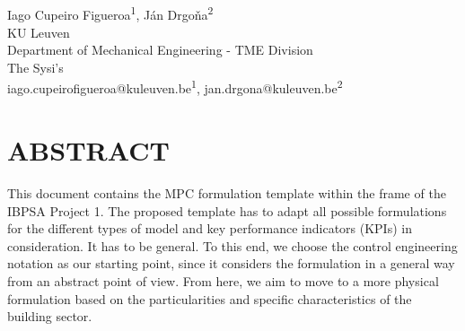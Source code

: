\documentclass[10pt]{extarticle}
\begin{document}
	
\begin{center}
\vspace{0.2in}
\\[14pt]

{\fontsize{11pt}{1.2em}\selectfont
Iago Cupeiro Figueroa\textsuperscript{1}, J\'an Drgo\v na\textsuperscript{2}
\\[11pt]

KU Leuven\\
Department of Mechanical Engineering - TME Division\\
The Sysi's \\[11pt]

iago.cupeirofigueroa@kuleuven.be\textsuperscript{1}, jan.drgona@kuleuven.be\textsuperscript{2} \\
}
\end{center}

\vspace{0.5cm}


\section*{ABSTRACT}

This document contains the MPC formulation template within the frame of the IBPSA Project 1.
The proposed template has to adapt all possible formulations for the different types of model and key performance indicators (KPIs) in consideration.
It has to be general.
To this end, we choose the control engineering notation as our starting point,
since it considers the formulation in a general way from an abstract point of view.
From here, we aim to move to a more physical formulation based on the particularities and specific characteristics of the building sector.

%
%	
\end{document}
